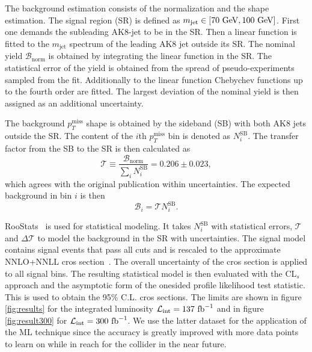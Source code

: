 \documentclass[prd, twocolumn, superscriptaddress,floatfix, nofootinbib, preprintnumbers]{revtex4-2}
\begin{document}
The background estimation consists of the normalization and the shape estimation.
The signal region (SR) is defined as $m_\text{jet} \in [70~{\rm GeV},100~{\rm GeV}]$. First one demands the subleading AK8-jet to be in the SR. Then a linear function is fitted to the $m_\text{jet}$ spectrum of the leading AK8 jet outside its SR. The nominal yield $\mathcal{B}_\text{norm}$ is obtained by integrating the linear function in the SR. The statistical error of the yield is obtained from the spread of pseudo-experiments sampled from the fit.
Additionally to the linear function Chebychev functions up to the fourth order are fitted. The largest deviation of the nominal yield is then assigned as an additional uncertainty.

The background $p_T^\text{miss}$ shape is obtained by the sideband (SB) with both AK8 jets outside the SR. The content of the  $i$th $p_T^\text{miss}$ bin is denoted as $N_i^\text{SB}$. The transfer factor from the SB to the SR is then calculated as
\begin{equation}
\mathcal{T}\equiv \frac{\mathcal{B}_\text{norm}}{\sum_i N_i^\text{SB}} = 0.206 \pm 0.023,
\end{equation}
which agrees with the original publication within uncertainties.
The expected background in bin $i$ is then 
\begin{equation}
\mathcal{B}_i = \mathcal{T}N_i^\text{SB}.
\end{equation}

{\sc RooStats}~\cite{rene_brun_2019_3895860} is used for statistical modeling. It takes $N_i^\text{SB}$ with statistical errors, $\mathcal{T}$ and $\Delta \mathcal{T}$  to model the background in the SR with uncertainties. The signal model contains signal events that pass all cuts and is rescaled to the approximate NNLO+NNLL cros section~\cite{Borschensky:2014cia}. The overall uncertainty of the cros section is applied to all signal bins. The resulting statistical model is then evaluated with the CL$_s$ approach and the asymptotic form of the onesided profile likelihood test statistic. This is used to obtain the 95\% C.L. cros sections. The limits are shown in figure \ref{fig:results} for the integrated luminosity $\mathcal{L}_\text{int}=137~{\rm fb}^{-1}$ and in figure \ref{fig:result300} for $\mathcal{L}_\text{int}=300~{\rm fb}^{-1}$. We use the latter dataset for the application of the ML technique since the accuracy is greatly improved with more data points to learn on while in reach for the collider in the near future.
\end{document}
